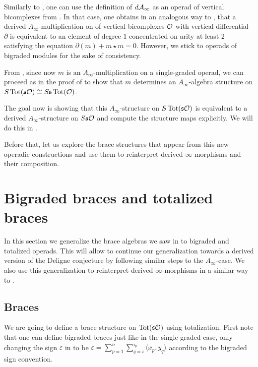 \documentclass[Thesis.tex]{subfiles}
\begin{document}
\begin{remark}
Similarly to , one can use the definition of $d\mathcal{A}_\infty$ as an operad of vertical bicomplexes from . In that case, one obtains in an analogous way to , that a derived $A_\infty$-multiplication on of vertical bicomplexes ${\mathcal O}$ with vertical differential $\partial$ is equivalent to an element of degree 1 concentrated on arity at least 2 satisfying the equation $\partial(m)+m\star m =0$. However, we stick to operads of bigraded modules for the sake of consistency.
\end{remark}

From , since now $m$ is an $A_\infty$-multiplication on a single-graded operad, we can proceed as in the proof of  to show that $m$ determines an $A_\infty$-algebra structure on $S\operatorname{Tot}(\mathfrak{s}{\mathcal O})\cong S\mathfrak{s} \operatorname{Tot}({\mathcal O})$. 

The goal now is showing that this $A_\infty$-structure on $S\operatorname{Tot}(\mathfrak{s}{\mathcal O})$ is equivalent to a derived $A_\infty$-structure on $S\mathfrak{s} {\mathcal O}$ and compute the structure maps explicitly. We will do this in . 

Before that, let us explore the brace structures that appear from this new operadic constructions and use them to reinterpret derived $\infty$-morphisms and their composition.



\section{Bigraded braces and totalized braces}\label{sectionbibraces}

In this section we generalize the brace algebras we saw in  to bigraded and totalized operads. This will allow to continue our generalization towards a derived version of the Deligne conjecture by following similar steps to the $A_\infty$-case. We also use this generalization to reinterpret derived $\infty$-morphisms in a similar way to .

\subsection{Braces}
We are going to define a brace structure on $\operatorname{Tot}(\mathfrak{s}{\mathcal O})$ using totalization. First note that one can define bigraded braces just like in the single-graded case, only changing the sign $\varepsilon$ in  to be $\varepsilon=\sum_{p=1}^n\sum_{q=i}^{i_p}\langle x_p,y_q\rangle$ according to the bigraded sign convention.
\end{document}
